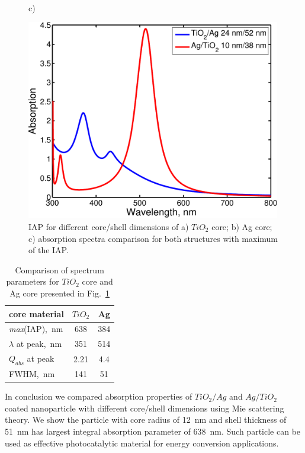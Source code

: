 \documentclass[aip,jap,reprint]{revtex4-1}
\begin{document}
\begin{figure}[!h]
\begin{minipage}[h]{0.47\textwidth}
  \end{minipage}\\
  \vspace{4pt}
  \begin{minipage}[h]{0.47\textwidth}
    \begin{flushleft}
      c)
    \end{flushleft}
  \end{minipage}
  \begin{minipage}[h]{0.47\textwidth}
    \includegraphics[width=0.99\textwidth]{compar}
  \end{minipage}%
  \caption{IAP for different core/shell
dimensions of a) $TiO_2$ core; b) Ag core; c) absorption spectra
comparison for both structures with maximum of the IAP.\label{fig:integral}}%
\end{figure}


\begin{table}
  \centering
  
\begin{tabular}{lcc}
\toprule
core material & $TiO_2$ & Ag\\
\midrule
\textit{max}(IAP),~nm & 638 & 384 \\
$\lambda$ at peak,~nm & 351 & 514 \\
$Q_{abs}$ at peak & 2.21 & 4.4 \\
FWHM,~nm & 141 & 51\\
\bottomrule
\end{tabular}
\caption{Comparison of spectrum parameters for $TiO_2$ core and Ag core
presented in Fig.~\ref{fig:integral} \label{tab:compare}}
\end{table}

In conclusion we compared absorption properties of $TiO_2/Ag$
and $Ag/TiO_2$
coated nanoparticle with different core/shell dimensions using Mie
scattering theory. We show the particle with core radius of 12~nm and
shell thickness of 51~nm has largest integral absorption parameter of
638~nm. Such particle can be used as effective photocatalytic material
for energy conversion applications.


\end{document}
